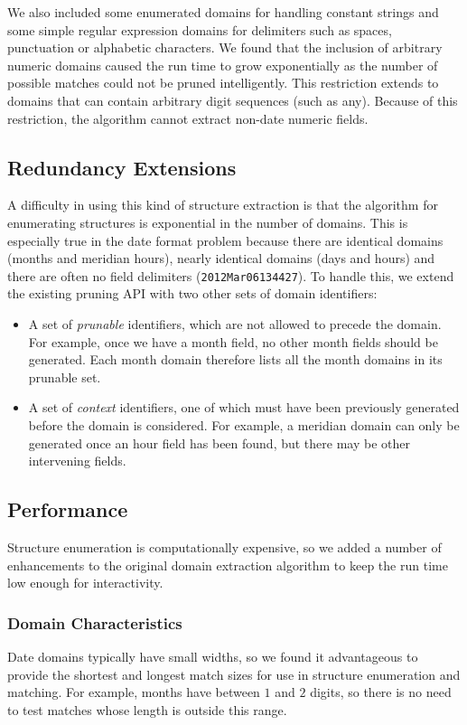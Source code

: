 We also included some enumerated domains for handling constant strings and some simple regular expression domains for delimiters such as spaces, punctuation or alphabetic characters. We found that the inclusion of arbitrary numeric domains caused the run time to grow exponentially as the number of possible matches could not be pruned intelligently. This restriction extends to domains that can contain arbitrary digit sequences (such as any). Because of this restriction, the algorithm cannot extract non-date numeric fields.

\subsection{Redundancy Extensions}
A difficulty in using this kind of structure extraction is that the algorithm for enumerating structures is exponential in the number of domains. This is especially true in the date format problem because there are identical domains (\eg months and meridian hours), nearly identical domains (\eg days and hours) and there are often no field delimiters (\eg \texttt{2012Mar06134427}). To handle this, we extend the existing pruning API with two other sets of domain identifiers:
\begin{itemize}
\setlength\itemsep{0em}
\item A set of \textit{prunable} identifiers, which are not allowed to precede the domain. For example, once we have a month field, no other month fields should be generated. Each month domain therefore lists all the month domains in its prunable set.
\item A set of \textit{context} identifiers, one of which must have been previously generated before the domain is considered. For example, a meridian domain can only be generated once an hour field has been found, but there may be other intervening fields.
\end{itemize}

\subsection{Performance}
Structure enumeration is computationally expensive, so we added a number of enhancements to the original domain extraction algorithm to keep the run time low enough for interactivity.

\subsubsection{Domain Characteristics}
Date domains typically have small widths, so we found it advantageous to provide the shortest and longest match sizes for use in structure enumeration and matching. For example, months have between $1$ and $2$ digits, so there is no need to test matches whose length is outside this range.


